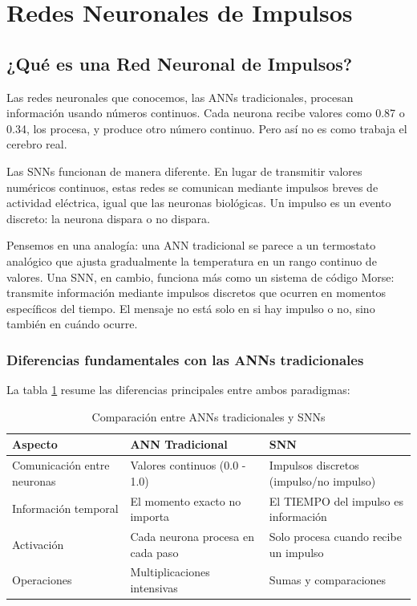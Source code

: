 \section{Redes Neuronales de Impulsos}

\subsection{¿Qué es una Red Neuronal de Impulsos?}

Las redes neuronales que conocemos, las ANNs tradicionales, procesan información usando números continuos. Cada neurona recibe valores como 0.87 o 0.34, los procesa, y produce otro número continuo. Pero así no es como trabaja el cerebro real.

Las SNNs funcionan de manera diferente. En lugar de transmitir valores numéricos continuos, estas redes se comunican mediante impulsos breves de actividad eléctrica, igual que las neuronas biológicas. Un impulso es un evento discreto: la neurona dispara o no dispara.

Pensemos en una analogía: una ANN tradicional se parece a un termostato analógico que ajusta gradualmente la temperatura en un rango continuo de valores. Una SNN, en cambio, funciona más como un sistema de código Morse: transmite información mediante impulsos discretos que ocurren en momentos específicos del tiempo. El mensaje no está solo en si hay impulso o no, sino también en cuándo ocurre.

\subsubsection{Diferencias fundamentales con las ANNs tradicionales}

La tabla \ref{tab:ann-vs-snn} resume las diferencias principales entre ambos paradigmas:

\begin{table}[htbp]
\centering
\begin{tabular}{p{4cm}p{5cm}p{5cm}}
\hline\hline
\textbf{Aspecto} & \textbf{ANN Tradicional} & \textbf{SNN} \\
\hline
Comunicación entre neuronas & Valores continuos (0.0 - 1.0) & Impulsos discretos (impulso/no impulso) \\
\hline
Información temporal & El momento exacto no importa & El TIEMPO del impulso es información \\
\hline
Activación & Cada neurona procesa en cada paso & Solo procesa cuando recibe un impulso \\
\hline
Operaciones & Multiplicaciones intensivas & Sumas y comparaciones \\

\hline\hline
\end{tabular}
\caption{Comparación entre ANNs tradicionales y SNNs}
\label{tab:ann-vs-snn}
\end{table}

